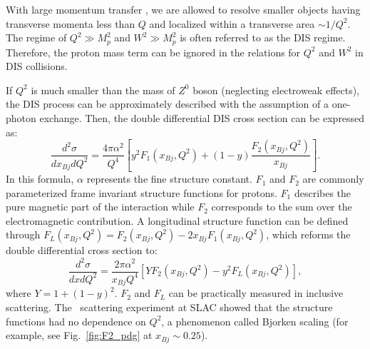 With large momentum transfer \qsq, we are allowed to resolve smaller objects
having transverse momenta less than $Q$ and localized within a transverse
area $\sim 1/Q^{2}$.
The regime of $Q^{2}\gg M^{2}_{p}$ and $W^{2}\gg M^{2}_{p}$ is often referred
to as the DIS regime. Therefore, the proton mass term can be ignored in the relations
for $Q^{2}$ and $W^{2}$ in DIS collisions.

If $Q^{2}$ is much smaller than the mass of $Z^{0}$ boson (neglecting electroweak effects), the DIS process
can be approximately described with the assumption of a one-photon exchange. Then,
the double differential DIS cross section can be expressed as:
\begin{equation}
\frac{d^{2}\sigma}{dx_{Bj}dQ^{2}}=\frac{4\pi\alpha^{2}}{Q^{4}}[y^{2}F_{1}(x_{Bj},Q^{2})+(1-y)\frac{F_{2}(x_{Bj},Q^{2})}{x_{Bj}}].
\end{equation}
In this formula, $\alpha$ represents the fine structure constant. $F_{1}$ and
$F_{2}$ are commonly parameterized frame invariant structure functions for
protons. $F_{1}$ describes the pure magnetic part of the interaction while $F_{2}$
corresponds to the sum over the electromagnetic contribution. A longitudinal structure function can
be defined through $F_{L}(x_{Bj},Q^{2})=F_{2}(x_{Bj},Q^{2})-2x_{Bj}F_{1}(x_{Bj},Q^{2})$,
which reforms the double differential cross section to:
\begin{equation}
\frac{d^{2}\sigma}{dxdQ^{2}}=\frac{2\pi\alpha^{2}}{x_{Bj}Q^{4}}[YF_{2}(x_{Bj},Q^{2})-y^{2}F_{L}(x_{Bj},Q^{2})],
\end{equation}
where $Y=1+(1-y)^{2}$. $F_{2}$ and $F_{L}$ can be practically measured in
inclusive scattering. The \ep\ scattering experiment at SLAC showed that the
structure functions had no dependence on $Q^{2}$, a phenomenon called Bjorken scaling 
(for example, see Fig.~\ref{fig:F2_pdg} at $x_{Bj}\sim0.25$).

